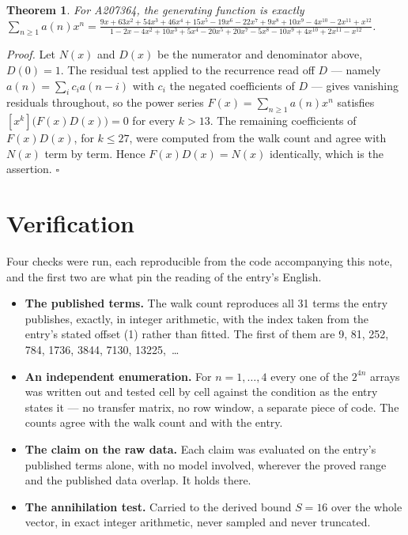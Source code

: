 \documentclass[11pt]{article}
\newtheorem{theorem}{Theorem}
\theoremstyle{definition}
\begin{document}
\begin{theorem} For A207364, the generating function is exactly $\sum_{n\ge 1} a(n)x^n = \frac{9x + 63x^{2} + 54x^{3} + 46x^{4} + 15x^{5} - 19x^{6} - 22x^{7} + 9x^{8} + 10x^{9} - 4x^{10} - 2x^{11} + x^{12}}{1 - 2x - 4x^{2} + 10x^{3} + 5x^{4} - 20x^{5} + 20x^{7} - 5x^{8} - 10x^{9} + 4x^{10} + 2x^{11} - x^{12}}$.\end{theorem}

{\itshape Proof.} Let $N(x)$ and $D(x)$ be the numerator and denominator above, $D(0)=1$. The residual test applied to the recurrence read off $D$ --- namely $a(n) = \sum_i c_i a(n-i)$ with $c_i$ the negated coefficients of $D$ --- gives vanishing residuals throughout, so the power series $F(x)=\sum_{n\ge 1}a(n)x^n$ satisfies $[x^k]\bigl(F(x)D(x)\bigr) = 0$ for every $k > 13$. The remaining coefficients of $F(x)D(x)$, for $k \le 27$, were computed from the walk count and agree with $N(x)$ term by term. Hence $F(x)D(x) = N(x)$ identically, which is the assertion. $\square$

\section{Verification}

Four checks were run, each reproducible from the code accompanying this note, and the first two are what pin the reading of the entry's English.

\begin{itemize}

\item {\bfseries The published terms.} The walk count reproduces all 31 terms the entry publishes, exactly, in integer arithmetic, with the index taken from the entry's stated offset (1) rather than fitted. The first of them are 9, 81, 252, 784, 1736, 3844, 7130, 13225,~\dots

\item {\bfseries An independent enumeration.} For $n = 1,\dots,4$ every one of the $2^{4n}$ arrays was written out and tested cell by cell against the condition as the entry states it --- no transfer matrix, no row window, a separate piece of code. The counts agree with the walk count and with the entry.

\item {\bfseries The claim on the raw data.} Each claim was evaluated on the entry's published terms alone, with no model involved, wherever the proved range and the published data overlap. It holds there.

\item {\bfseries The annihilation test.} Carried to the derived bound $S = 16$ over the whole vector, in exact integer arithmetic, never sampled and never truncated.

\end{itemize}
\end{document}
